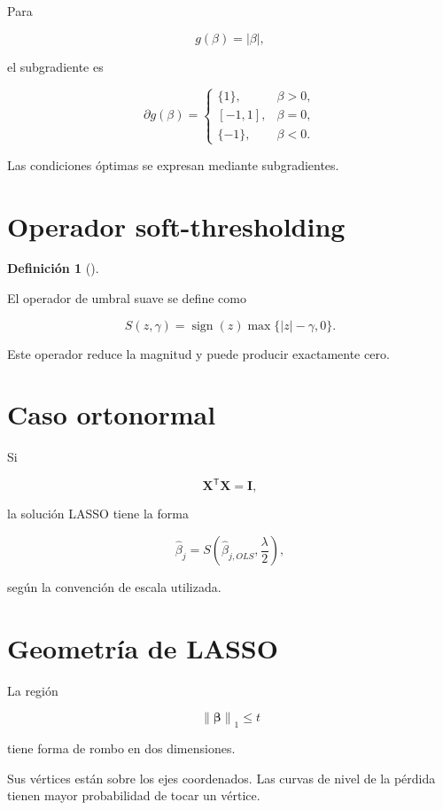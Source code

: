 \documentclass[
  spanish,
  11pt,
  letterpaper,
  DIV=11,
  numbers=noendperiod]{scrreprt}
\theoremstyle{definition}
\newtheorem{definition}{Definición}[chapter]
\theoremstyle{plain}
\theoremstyle{definition}
\theoremstyle{remark}
\begin{document}
Para

\[
g(\beta)=|\beta|,
\]

el subgradiente es

\[
\partial g(\beta)
=
\begin{cases}
\{1\}, & \beta>0,\\
[-1,1], & \beta=0,\\
\{-1\}, & \beta<0.
\end{cases}
\]

Las condiciones óptimas se expresan mediante subgradientes.

\section{Operador soft-thresholding}\label{operador-soft-thresholding}

\begin{definition}[]\protect\hypertarget{def-soft-thresholding}{}\label{def-soft-thresholding}

El operador de umbral suave se define como

\[
S(z,\gamma)
=
\operatorname{sign}(z)
\max
\{
|z|-\gamma,
0
\}.
\]

\end{definition}

Este operador reduce la magnitud y puede producir exactamente cero.

\section{Caso ortonormal}\label{caso-ortonormal}

Si

\[
\mathbf{X}^{\mathsf T}\mathbf{X}
=
\mathbf{I},
\]

la solución LASSO tiene la forma

\[
\widehat{\beta}_j
=
S
\left(
\widehat{\beta}_{j,OLS},
\frac{\lambda}{2}
\right),
\]

según la convención de escala utilizada.

\section{Geometría de LASSO}\label{geometruxeda-de-lasso}

La región

\[
\left\|
\boldsymbol{\beta}
\right\|_1
\leq
t
\]

tiene forma de rombo en dos dimensiones.

Sus vértices están sobre los ejes coordenados. Las curvas de nivel de la
pérdida tienen mayor probabilidad de tocar un vértice.
\end{document}
